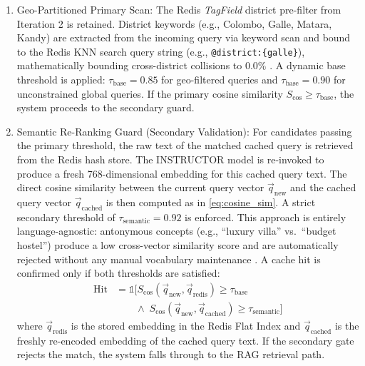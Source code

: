 \documentclass{ieeeaccess}
\begin{document}
\begin{enumerate}
    \item {Geo-Partitioned Primary Scan}: The Redis \emph{TagField} district pre-filter from Iteration 2 is retained. District keywords (e.g., Colombo, Galle, Matara, Kandy) are extracted from the incoming query via keyword scan and bound to the Redis KNN search query string (e.g., \texttt{@district:\{galle\}}), mathematically bounding cross-district collisions to $0.0\%$ \cite{bang-gptcache-2023}. A dynamic base threshold is applied: $\tau_{\text{base}} = 0.85$ for geo-filtered queries and $\tau_{\text{base}} = 0.90$ for unconstrained global queries. If the primary cosine similarity $S_{\text{cos}} \ge \tau_{\text{base}}$, the system proceeds to the secondary guard.

    \item{Semantic Re-Ranking Guard (Secondary Validation)}: For candidates passing the primary threshold, the raw text of the matched cached query is retrieved from the Redis hash store. The INSTRUCTOR model is re-invoked to produce a fresh 768-dimensional embedding for this cached query text. The direct cosine similarity between the current query vector $\vec{q}_{\text{new}}$ and the cached query vector $\vec{q}_{\text{cached}}$ is then computed as in \eqref{eq:cosine_sim}. A strict secondary threshold of $\tau_{\text{semantic}} = 0.92$ is enforced. This approach is entirely language-agnostic: antonymous concepts (e.g., ``luxury villa'' vs.\ ``budget hostel'') produce a low cross-vector similarity score and are automatically rejected without any manual vocabulary maintenance \cite{reimers-sbert-2019, biton-exact-hits-2025}. A cache hit is confirmed only if both thresholds are satisfied:
    \begin{equation}
    \label{eq:two_stage_gate}
    \begin{split}
        \text{Hit} &= \mathbb{1}\Big[ S_{\text{cos}}(\vec{q}_{\text{new}}, \vec{q}_{\text{redis}}) \ge \tau_{\text{base}} \\
        &\qquad \wedge \; S_{\text{cos}}(\vec{q}_{\text{new}}, \vec{q}_{\text{cached}}) \ge \tau_{\text{semantic}} \Big]
    \end{split}
    \end{equation}
    where $\vec{q}_{\text{redis}}$ is the stored embedding in the Redis Flat Index and $\vec{q}_{\text{cached}}$ is the freshly re-encoded embedding of the cached query text. If the secondary gate rejects the match, the system falls through to the RAG retrieval path.


\end{enumerate}
\end{document}
